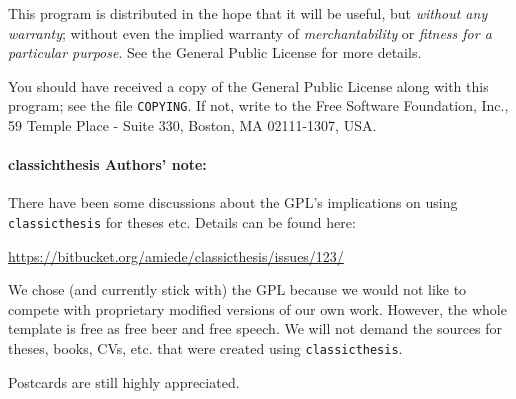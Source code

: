 This program is distributed in the hope that it will be useful,
but \emph{without any warranty}; without even the implied warranty of
\emph{merchant\-ability} or \emph{fitness for a particular purpose}.
See the
 General Public License for more details.

You should have received a copy of the  General
Public License
along with this program; see the file \texttt{COPYING}.  If not,
write to
the Free Software Foundation, Inc., 59 Temple Place - Suite 330,
Boston, MA 02111-1307, USA.

\paragraph{classichthesis Authors' note:} There have been some discussions about the GPL's implications on using \texttt{classicthesis} for theses etc. Details can be found here:
\begin{center}
  \url{https://bitbucket.org/amiede/classicthesis/issues/123/}
\end{center}

We chose (and currently stick with) the GPL because we would not like to compete with proprietary modified versions of our own work. However, the whole template is free as free beer and free speech. We will not demand the sources for theses, books, CVs, etc. that were created using \texttt{classicthesis}.

Postcards are still highly appreciated.






